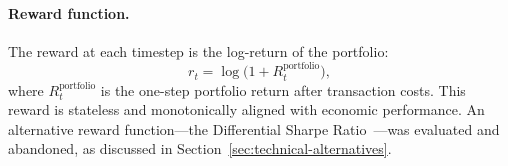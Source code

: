
\paragraph{Reward function.}
The reward at each timestep is the log-return of the portfolio:
\begin{equation}
  r_t = \log\!\bigl(1 + R_t^{\text{portfolio}}\bigr),
\end{equation}
where $R_t^{\text{portfolio}}$ is the one-step portfolio return after
transaction costs. This reward is stateless and monotonically aligned with
economic performance. An alternative reward function---the Differential
Sharpe Ratio~\cite{moody2001learning}---was evaluated and abandoned, as
discussed in Section~\ref{sec:technical-alternatives}.

